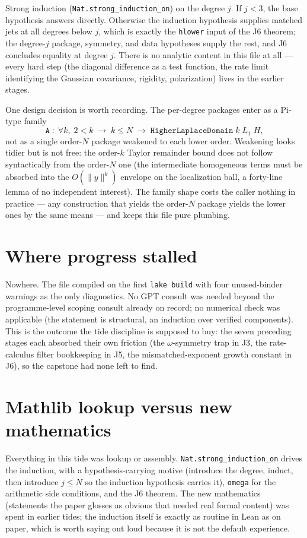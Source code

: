 \documentclass[11pt]{article}
\newcommand{\code}[1]{\texttt{#1}}
\begin{document}
Strong induction (\code{Nat.strong\_induction\_on}) on the degree
$j$. If $j < 3$, the base hypothesis answers directly. Otherwise the
induction hypothesis supplies matched jets at all degrees below $j$,
which is exactly the \code{hlower} input of the J6 theorem; the
degree-$j$ package, symmetry, and data hypotheses supply the rest,
and J6 concludes equality at degree $j$. There is no analytic content
in this file at all --- every hard step (the diagonal difference as a
test function, the rate limit identifying the Gaussian covariance,
rigidity, polarization) lives in the earlier stages.

One design decision is worth recording. The per-degree packages enter
as a Pi-type family
\[
  \code{A} \;:\; \forall k,\; 2 < k \;\to\; k \le N \;\to\;
  \code{HigherLaplaceDomain}\; k\; L_1\; H,
\]
not as a single order-$N$ package weakened to each lower order.
Weakening looks tidier but is not free: the order-$k$ Taylor
remainder bound does not follow syntactically from the order-$N$ one
(the intermediate homogeneous terms must be absorbed into the
$O(\|y\|^k)$ envelope on the localization ball, a forty-line lemma
of no independent interest). The family shape costs the caller
nothing in practice --- any construction that yields the order-$N$
package yields the lower ones by the same means --- and keeps this
file pure plumbing.

\section{Where progress stalled}

Nowhere. The file compiled on the first \code{lake build} with four
unused-binder warnings as the only diagnostics. No GPT consult was
needed beyond the programme-level scoping consult already on record;
no numerical check was applicable (the statement is structural, an
induction over verified components). This is the outcome the tide
discipline is supposed to buy: the seven preceding stages each
absorbed their own friction (the $\omega$-symmetry trap in J3, the
rate-calculus filter bookkeeping in J5, the mismatched-exponent
growth constant in J6), so the capstone had none left to find.

\section{Mathlib lookup versus new mathematics}

Everything in this tide was lookup or assembly.
\code{Nat.strong\_induction\_on} drives the induction, with a
hypothesis-carrying motive (introduce the degree, induct, then
introduce $j \le N$
so the induction hypothesis carries it), \code{omega} for the
arithmetic side conditions, and the J6 theorem. The new
mathematics (statements the paper glosses as obvious that needed
real formal content) was spent in earlier tides; the induction
itself is exactly as routine in Lean as on paper, which is worth
saying out loud because it is not the default experience.
\end{document}
